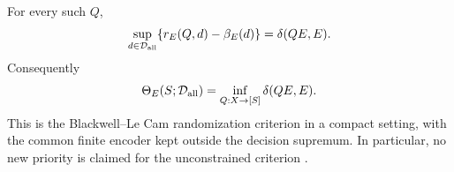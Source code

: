 \begin{theorem}
\label{thm:v8-duality}
For every such $Q$,
\begin{equation}
 \sup_{d\in\mathcal D_{\rm all}}\{r_E(Q,d)-\beta_E(d)\}
       =\delta(QE,E).
                                                               \label{eq:v8-duality} 
\end{equation}
Consequently
\begin{equation}
 \Theta_E(S;\mathcal D_{\rm all})
       =\inf_{Q:X\to[S]}\delta(QE,E).                 \label{eq:v8-terminalprofile}
\end{equation}
This is the Blackwell--Le Cam randomization criterion in a compact
setting, with the common finite encoder kept outside the decision
supremum. In particular, no new priority is claimed for the
unconstrained criterion \cite{Blackwell1953,LeCam1964,Torgersen1991}.
\end{theorem}
